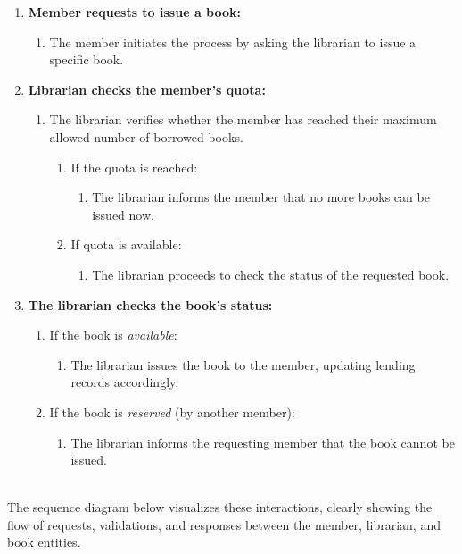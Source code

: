 \begin{enumerate}
\item
\protect{}\label{51Mv7obssQEgVjF7AovsK}
\textbf{Member requests to issue a book:}

\begin{enumerate}
\item
The member initiates the process by asking the librarian to issue a specific book.
\end{enumerate}
\item
\protect{}\label{eT3k-2adttgYumZ1fW47E}
\textbf{Librarian checks the member's quota:}

\begin{enumerate}
\item
The librarian verifies whether the member has reached their maximum allowed number of borrowed books.

\begin{enumerate}
\item
If the quota is reached:

\begin{enumerate}
\item
The librarian informs the member that no more books can be issued now.
\end{enumerate}
\item
If quota is available:

\begin{enumerate}
\item
The librarian proceeds to check the status of the requested book.
\end{enumerate}
\end{enumerate}
\end{enumerate}
\item
\protect{}\label{yYs-R_eM8-y_ANmumQ-8H}
\textbf{The librarian checks the book's status:}

\begin{enumerate}
\item
If the book is \emph{available}:

\begin{enumerate}
\item
The librarian issues the book to the member, updating lending records accordingly.
\end{enumerate}
\item
If the book is \emph{reserved} (by another member):

\begin{enumerate}
\item
The librarian informs the requesting member that the book cannot be issued.
\end{enumerate}
\end{enumerate}
\end{enumerate}
\\
The sequence diagram below visualizes these interactions, clearly showing the flow of requests, validations, and responses between the member, librarian, and book entities.

